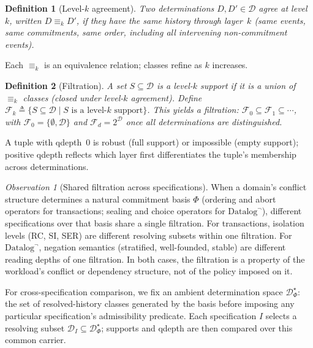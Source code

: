 \documentclass[acmsmall,review,anonymous]{acmart}
\newtheorem{definition}{Definition}
\theoremstyle{remark}
\newtheorem{observation}{Observation}
\numberwithin{definition}{section}
\numberwithin{theorem}{section}
\numberwithin{lemma}{section}
\numberwithin{corollary}{section}
\numberwithin{remark}{section}
\numberwithin{example}{section}
\numberwithin{observation}{section}
\numberwithin{assumption}{section}
\begin{document}
\begin{definition}[Level-$k$ agreement]
  \label{def:level-k-agreement}
  Two determinations $D, D' \in \mathcal{D}$ \emph{agree at level $k$},
  written $D \equiv_k D'$, if they have the same history through
  layer~$k$ (same events, same commitments, same order, including all
  intervening non-commitment events).
\end{definition}

\noindent
Each $\equiv_k$ is an equivalence relation; classes refine as $k$
increases.

\begin{definition}[Filtration]
  \label{def:filtration}
  A set $S \subseteq \mathcal{D}$ is a \emph{level-$k$ support} if it
  is a union of $\equiv_k$ classes (closed under level-$k$ agreement).
  Define $\mathcal{F}_k \triangleq \{S \subseteq \mathcal{D} \mid
  S \text{ is a level-}k\text{ support}\}$.
  This yields a filtration:
  $\mathcal{F}_0 \subseteq \mathcal{F}_1 \subseteq \cdots$, with
  $\mathcal{F}_0 = \{\emptyset, \mathcal{D}\}$ and
  $\mathcal{F}_d = 2^{\mathcal{D}}$ once all determinations are
  distinguished.
\end{definition}

\noindent
A tuple with qdepth~$0$ is robust (full support) or impossible (empty
support); positive qdepth reflects which layer first differentiates
the tuple's membership across determinations.

\begin{observation}[Shared filtration across specifications]
  \label{obs:basis-entails-filtration}
  When a domain's conflict structure determines a natural commitment
  basis $\Phi$ (ordering and abort operators for transactions;
  sealing and choice operators for $\mbox{Datalog}^\neg$), different
  specifications over that basis share a single filtration.
  For transactions, isolation levels (RC, SI, SER) are different
  resolving subsets within one filtration.
  For $\mbox{Datalog}^\neg$, negation semantics (stratified,
  well-founded, stable) are different reading depths of one
  filtration.
  In both cases, the filtration is a property of the workload's
  conflict or dependency structure, not of the policy imposed on it.
\end{observation}

\noindent
For cross-specification comparison, we fix an ambient determination
space $\mathcal{D}^\star_\Phi$: the set of resolved-history classes
generated by the basis before imposing any particular specification's
admissibility predicate.
Each specification $I$ selects a resolving subset
$\mathcal{D}_I \subseteq \mathcal{D}^\star_\Phi$; supports and qdepth
are then compared over this common carrier.
\end{document}
